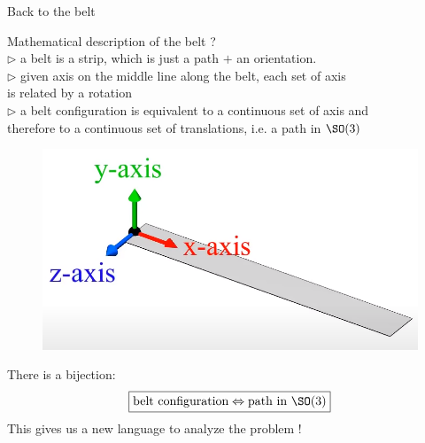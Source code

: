\documentclass[9pt]{beamer}
\renewcommand{\emph}{\alert}
\begin{document}
\begin{frame}{Back to the belt}

    Mathematical description of the belt ?\\[0.3cm]
    \quad $\triangleright$ a belt is a strip, which is just a \emph{path} $+$ an \emph{orientation}.\\[0.2cm]
    \quad $\triangleright$ given axis on the middle line along the belt, each set of axis \\ \hspace{0.5cm} is related by a rotation \\[0.2cm]
    \quad $\triangleright$ a belt configuration is equivalent to a continuous set of axis and \\ \hspace{0.5cm} therefore to a continuous set of translations, i.e. a \emph{path in $\SO(3)$}
    \begin{figure}
        \centering
        \includegraphics[scale=0.12]{Pictures/beltaxis.png}
    \end{figure}
    There is a bijection:
    \begin{equation*}
        \boxed{\text{belt configuration} \Leftrightarrow \text{path in $\SO(3)$}}
    \end{equation*}
    This gives us a new language to analyze the problem !

\end{frame}
\end{document}
